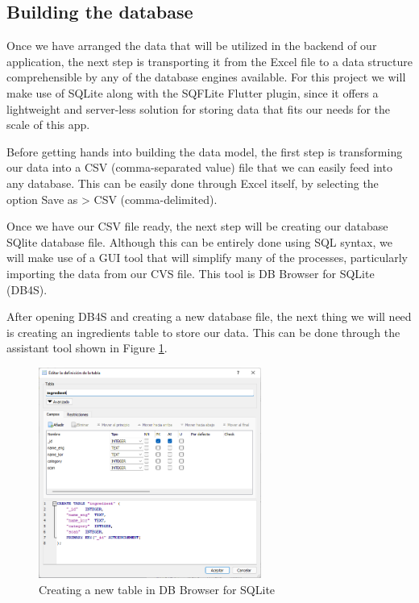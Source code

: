 \subsection{Building the database}

Once we have arranged the data that will be utilized in the backend of our application, the next step is transporting it from the Excel file to a data structure comprehensible by any of the database engines available. For this project we will make use of SQLite along with the SQFLite Flutter plugin, since it offers a lightweight and server-less solution for storing data that fits our needs for the scale of this app.

Before getting hands into building the data model, the first step is transforming our data into a CSV (comma-separated value) file that we can easily feed into any database. This can be easily done through Excel itself, by selecting the option Save as > CSV (comma-delimited).

Once we have our CSV file ready, the next step will be creating our database SQlite database file. Although this can be entirely done using SQL syntax, we will make use of a GUI tool that will simplify many of the processes, particularly importing the data from our CVS file. This tool is DB Browser for SQLite (DB4S).

After opening DB4S and creating a new database file, the next thing we will need is creating an ingredients table to store our data. This can be done through the assistant tool shown in Figure \ref{fig:db4s-create}.

\begin{figure}[h]
  \centering
  \includegraphics[width=0.65\textwidth]{Figures/db4s-create.png}
  \caption{
    Creating a new table in DB Browser for SQLite
  }
  \label{fig:db4s-create}
\end{figure}

